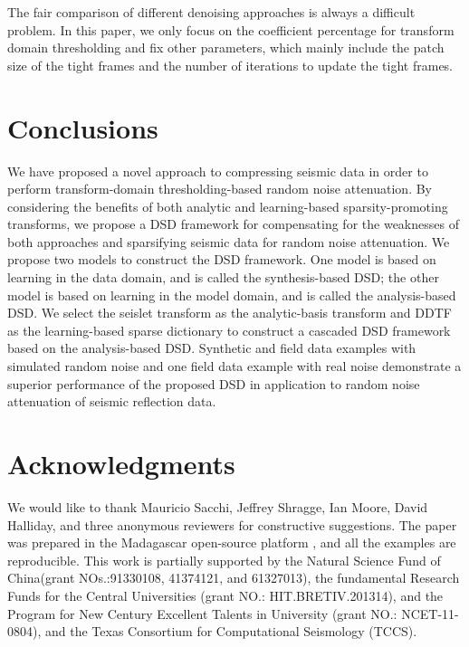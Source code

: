 The fair comparison of different denoising approaches is always a difficult problem. In this paper, we only focus on the coefficient percentage for transform domain thresholding %
and fix other parameters, which mainly include the patch size of the tight frames and the number of iterations to update the tight frames. 

\section{Conclusions}
We have proposed a novel approach to compressing seismic data in order to perform transform-domain thresholding-based random noise attenuation. By considering the benefits of both analytic and learning-based sparsity-promoting transforms, we propose a DSD framework for compensating for the weaknesses of both approaches and sparsifying seismic data for random noise attenuation. We propose two models to construct the DSD framework. One model is based on learning in the data domain, and is called the synthesis-based DSD; the other model is based on learning in the model domain, and is called the analysis-based DSD.  We select the seislet transform as the analytic-basis transform and DDTF as the learning-based sparse dictionary to construct a cascaded DSD framework based on the analysis-based DSD. Synthetic and field data examples with simulated random noise and one field data example with real noise demonstrate a superior performance of the proposed DSD in application to random noise attenuation of seismic reflection data. 

\section{Acknowledgments}
We would like to thank Mauricio Sacchi, Jeffrey Shragge, Ian Moore, David Halliday, and three anonymous reviewers for constructive suggestions. The paper was prepared in the Madagascar open-source platform \cite[]{mada2013}, and all the examples are reproducible. This work is partially supported by the Natural Science Fund of China(grant NOs.:91330108, 41374121, and 61327013), the fundamental Research Funds for the Central Universities (grant NO.: HIT.BRETIV.201314), and the Program for New Century Excellent Talents in University (grant NO.: NCET-11-0804), and the Texas Consortium for Computational Seismology (TCCS).




